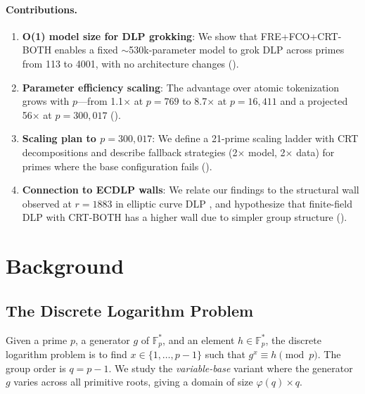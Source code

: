 \documentclass[11pt]{article}
\newcommand{\Fps}{\mathbb{F}_p^*}
\begin{document}
\paragraph{Contributions.}
\begin{enumerate}[leftmargin=*]
    \item \textbf{O(1) model size for DLP grokking}: We show that FRE+FCO+CRT-BOTH enables a fixed $\sim$530k-parameter model to grok DLP across primes from 113 to 4001, with no architecture changes ().
    \item \textbf{Parameter efficiency scaling}: The advantage over atomic tokenization grows with $p$---from 1.1$\times$ at $p = 769$ to 8.7$\times$ at $p = 16{,}411$ and a projected 56$\times$ at $p = 300{,}017$ ().
    \item \textbf{Scaling plan to $p = 300{,}017$}: We define a 21-prime scaling ladder with CRT decompositions and describe fallback strategies (2$\times$ model, 2$\times$ data) for primes where the base configuration fails ().
    \item \textbf{Connection to ECDLP walls}: We relate our findings to the structural wall observed at $r = 1883$ in elliptic curve DLP \citep{svensson2026ecdlp}, and hypothesize that finite-field DLP with CRT-BOTH has a higher wall due to simpler group structure ().
\end{enumerate}



\section{Background}
\label{sec:background}

\subsection{The Discrete Logarithm Problem}

Given a prime $p$, a generator $g$ of $\Fps$, and an element $h \in \Fps$, the discrete logarithm problem is to find $x \in \{1, \ldots, p-1\}$ such that $g^x \equiv h \pmod{p}$. The group order is $q = p - 1$. We study the \emph{variable-base} variant where the generator $g$ varies across all primitive roots, giving a domain of size $\varphi(q) \times q$.
\end{document}
